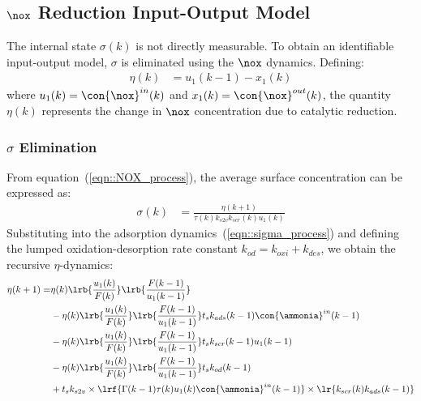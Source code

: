 \subsection{$\nox$ Reduction Input-Output Model \label{sec::nox_io_model}}


The internal state $\sigma(k)$ is not directly measurable. To obtain an identifiable input-output model, $\sigma$ is
eliminated using the $\nox$ dynamics. Defining:
\begin{align}
    \eta(k) &= u_1(k-1) - x_1(k)
    \label{eqn::eta_def}
\end{align}
where $u_1(k) = \con{\nox}^{in}(k)$ and $x_1(k) = \con{\nox}^{out}(k)$, the quantity $\eta(k)$ represents the change
in $\nox$ concentration due to catalytic reduction.

\subsubsection{$\sigma$ Elimination}
From equation~(\ref{eqn::NOX_process}), the average surface concentration can be expressed as:
\begin{align}
    \sigma(k) &= \frac{\eta(k+1)}{\tau(k) k_{s2v} k_{scr}(k) u_1(k)}
    \label{eqn::sigma_elim}
\end{align}
Substituting into the adsorption dynamics~(\ref{eqn::sigma_process}) and defining the lumped
oxidation-desorption rate constant $k_{od} = k_{oxi} + k_{des}$, we obtain the recursive $\eta$-dynamics:
\begin{align}
    \eta(k+1) =& \eta(k) \lrb{\frac{u_1(k)}{F(k)}} \lrb{\frac{F(k-1)}{u_1(k-1)}} \notag \\
        &- \eta(k) \lrb{\frac{u_1(k)}{F(k)}} \lrb{\frac{F(k-1)}{u_1(k-1)}}
            t_s k_{ads}(k-1) \con{\ammonia}^{in}(k-1) \notag \\
        &- \eta(k) \lrb{\frac{u_1(k)}{F(k)}} \lrb{\frac{F(k-1)}{u_1(k-1)}}
            t_s k_{scr}(k-1) u_1(k-1) \notag \\
        &- \eta(k) \lrb{\frac{u_1(k)}{F(k)}} \lrb{\frac{F(k-1)}{u_1(k-1)}}
            t_s k_{od}(k-1) \notag \\
        &+ t_s k_{s2v} \times \lrf{\Gamma(k-1) \tau(k) u_1(k) \con{\ammonia}^{in}(k-1)}
            \times \lr{k_{scr}(k) k_{ads}(k-1)}
    \label{eqn::disc_NOx}
\end{align}


